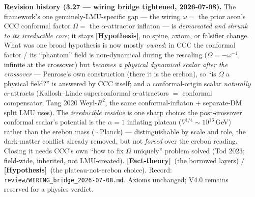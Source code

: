 \documentclass[11pt]{article}
\newcommand{\factth}{\textcolor{green!40!black}{\textbf{[Fact-theory]}}}
\newcommand{\hyp}{\textcolor{orange!80!black}{\textbf{[Hypothesis]}}}
\begin{document}
{\smallskip\noindent\textbf{Revision history (3.27 --- wiring bridge tightened, 2026-07-08).} The framework's one genuinely-LMU-specific gap --- the wiring $\omega=$ the prior aeon's CCC conformal factor $\Omega=$ the $\alpha$-attractor inflaton --- is \emph{demarcated and shrunk to its irreducible core}; it stays \hyp, no spine, axiom, or falsifier change. What was one broad hypothesis is now mostly \emph{owned}: in CCC the conformal factor / its ``phantom'' field is non-dynamical during the rescaling ($\Omega=-\omega^{-1}$, infinite at the crossover) but \emph{becomes a physical dynamical scalar after the crossover} --- Penrose's own construction (there it is the erebon), so ``is $\Omega$ a physical field?'' is answered by CCC itself; and a conformal-origin scalar \emph{naturally} $\alpha$-attracts (Kallosh--Linde superconformal $\alpha$-attractors $=$ conformal compensator; Tang 2020 Weyl-$R^2$, the same conformal-inflaton $+$ separate-DM split LMU uses). The \emph{irreducible residue} is one sharp choice: the post-crossover conformal scalar's potential is the $\alpha{=}1$ inflating plateau ($V^{1/4}\!\sim\!10^{16}$\,GeV) rather than the erebon mass ($\sim$Planck) --- distinguishable by scale and role, the dark-matter conflict already removed, but not \emph{forced} over the erebon reading. Closing it needs CCC's own ``how to fix $\Omega$ uniquely'' problem solved (Tod 2023; field-wide, inherited, not LMU-created). \factth\ (the borrowed layers) / \hyp\ (the plateau-not-erebon choice). Record: \texttt{review/WIRING\_bridge\_2026-07-08.md}. Axioms unchanged; V4.0 remains reserved for a physics verdict.

}
\end{document}

